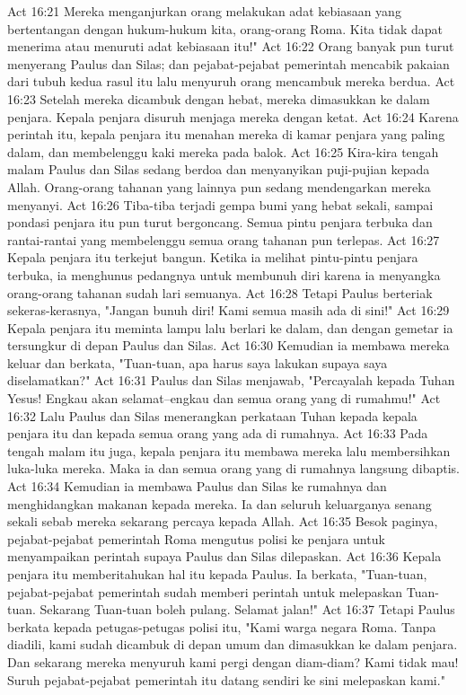 Act 16:21  Mereka menganjurkan orang melakukan adat kebiasaan yang bertentangan dengan hukum-hukum kita, orang-orang Roma. Kita tidak dapat menerima atau menuruti adat kebiasaan itu!"
Act 16:22  Orang banyak pun turut menyerang Paulus dan Silas; dan pejabat-pejabat pemerintah mencabik pakaian dari tubuh kedua rasul itu lalu menyuruh orang mencambuk mereka berdua.
Act 16:23  Setelah mereka dicambuk dengan hebat, mereka dimasukkan ke dalam penjara. Kepala penjara disuruh menjaga mereka dengan ketat.
Act 16:24  Karena perintah itu, kepala penjara itu menahan mereka di kamar penjara yang paling dalam, dan membelenggu kaki mereka pada balok.
Act 16:25  Kira-kira tengah malam Paulus dan Silas sedang berdoa dan menyanyikan puji-pujian kepada Allah. Orang-orang tahanan yang lainnya pun sedang mendengarkan mereka menyanyi.
Act 16:26  Tiba-tiba terjadi gempa bumi yang hebat sekali, sampai pondasi penjara itu pun turut bergoncang. Semua pintu penjara terbuka dan rantai-rantai yang membelenggu semua orang tahanan pun terlepas.
Act 16:27  Kepala penjara itu terkejut bangun. Ketika ia melihat pintu-pintu penjara terbuka, ia menghunus pedangnya untuk membunuh diri karena ia menyangka orang-orang tahanan sudah lari semuanya.
Act 16:28  Tetapi Paulus berteriak sekeras-kerasnya, "Jangan bunuh diri! Kami semua masih ada di sini!"
Act 16:29  Kepala penjara itu meminta lampu lalu berlari ke dalam, dan dengan gemetar ia tersungkur di depan Paulus dan Silas.
Act 16:30  Kemudian ia membawa mereka keluar dan berkata, "Tuan-tuan, apa harus saya lakukan supaya saya diselamatkan?"
Act 16:31  Paulus dan Silas menjawab, "Percayalah kepada Tuhan Yesus! Engkau akan selamat--engkau dan semua orang yang di rumahmu!"
Act 16:32  Lalu Paulus dan Silas menerangkan perkataan Tuhan kepada kepala penjara itu dan kepada semua orang yang ada di rumahnya.
Act 16:33  Pada tengah malam itu juga, kepala penjara itu membawa mereka lalu membersihkan luka-luka mereka. Maka ia dan semua orang yang di rumahnya langsung dibaptis.
Act 16:34  Kemudian ia membawa Paulus dan Silas ke rumahnya dan menghidangkan makanan kepada mereka. Ia dan seluruh keluarganya senang sekali sebab mereka sekarang percaya kepada Allah.
Act 16:35  Besok paginya, pejabat-pejabat pemerintah Roma mengutus polisi ke penjara untuk menyampaikan perintah supaya Paulus dan Silas dilepaskan.
Act 16:36  Kepala penjara itu memberitahukan hal itu kepada Paulus. Ia berkata, "Tuan-tuan, pejabat-pejabat pemerintah sudah memberi perintah untuk melepaskan Tuan-tuan. Sekarang Tuan-tuan boleh pulang. Selamat jalan!"
Act 16:37  Tetapi Paulus berkata kepada petugas-petugas polisi itu, "Kami warga negara Roma. Tanpa diadili, kami sudah dicambuk di depan umum dan dimasukkan ke dalam penjara. Dan sekarang mereka menyuruh kami pergi dengan diam-diam? Kami tidak mau! Suruh pejabat-pejabat pemerintah itu datang sendiri ke sini melepaskan kami."
